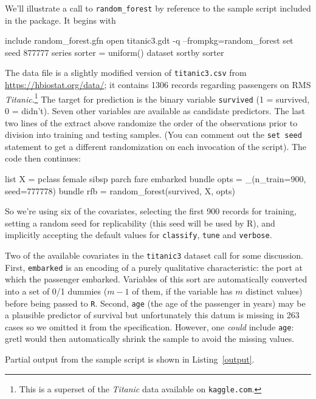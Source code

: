 \documentclass{article}
\begin{document}
We'll illustrate a call to \texttt{random\_forest} by reference to the
sample script included in the package.  It begins with
%
\begin{code}
include random_forest.gfn
open titanic3.gdt -q --frompkg=random_forest
set seed 877777
series sorter = uniform()
dataset sortby sorter
\end{code}
%
The data file is a slightly modified version of \texttt{titanic3.csv}
from \url{https://hbiostat.org/data/}; it contains 1306 records
regarding passengers on RMS \textit{Titanic}.\footnote{This is a
  superset of the \textit{Titanic} data available on
  \texttt{kaggle.com}.}  The target for prediction is the binary
variable \texttt{survived} (1 = survived, 0 = didn't). Seven other
variables are available as candidate predictors.  The last two lines
of the extract above randomize the order of the observations prior to
division into training and testing samples.  (You can comment out the
\texttt{set seed} statement to get a different randomization on each
invocation of the script).  The code then continues:
%
\begin{code}
list X = pclass female sibsp parch fare embarked
bundle opts = _(n_train=900, seed=777778)
bundle rfb = random_forest(survived, X, opts)
\end{code}
%
So we're using six of the covariates, selecting the first 900 records
for training, setting a random seed for replicability (this seed will
be used by \textsf{R}), and implicitly accepting the default values
for \texttt{classify}, \texttt{tune} and \texttt{verbose}.

Two of the available covariates in the \texttt{titanic3} dataset call
for some discussion. First, \texttt{embarked} is an encoding of a
purely qualitative characteristic: the port at which the passenger
embarked. Variables of this sort are automatically converted into a
set of 0/1 dummies ($m-1$ of them, if the variable has $m$ distinct
values) before being passed to \texttt{R}. Second, \texttt{age} (the
age of the passenger in years) may be a plausible predictor of
survival but unfortunately this datum is missing in 263 cases so we
omitted it from the specification. However, one \textit{could} include
\texttt{age}: gretl would then automatically shrink the sample to
avoid the missing values.

Partial output from the sample script is shown in
Listing~\ref{output}.
\end{document}
